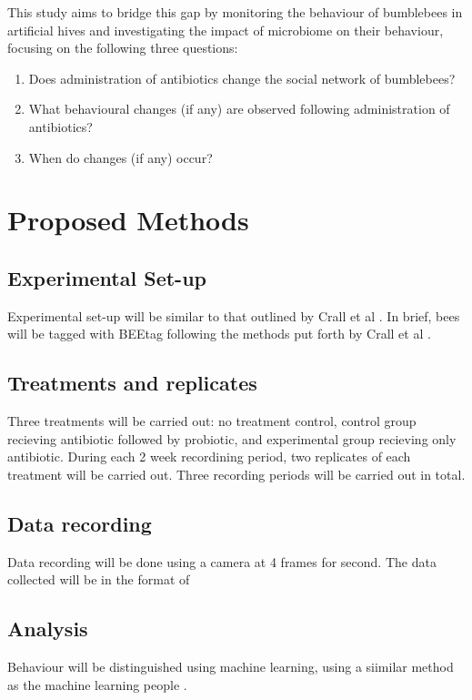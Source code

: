\documentclass[11pt]{article}
\begin{document}
        This study aims to bridge this gap by monitoring the behaviour of bumblebees in artificial hives and investigating the impact of microbiome on their behaviour,
        focusing on the following three questions:
        \begin{enumerate}
            \item Does administration of antibiotics change the social network of bumblebees?
            \item What behavioural changes (if any) are observed following administration of antibiotics?
            \item When do changes (if any) occur?
        \end{enumerate}

    \section{Proposed Methods}
        \subsection{Experimental Set-up}
            Experimental set-up will be similar to that outlined by Crall et al
            \cite{crall2018neonicotinoid}.
            In brief, bees will be tagged with BEEtag following the methods put forth by Crall et al
            \cite{crall2015beetag}.

        \subsection{Treatments and replicates}
            Three treatments will be carried out: no treatment control,
            control group recieving antibiotic followed by probiotic,
            and experimental group recieving only antibiotic.
            During each 2 week recordining period,
            two replicates of each treatment will be carried out.
            Three recording periods will be carried out in total.

        \subsection{Data recording}
            Data recording will be done using a camera at 4 frames for second. The data collected will be in the format of 
            
        \subsection{Analysis}
            Behaviour will be distinguished using machine learning, using a siimilar method as the machine learning people
            \cite{blut2017automated}.
\end{document}
